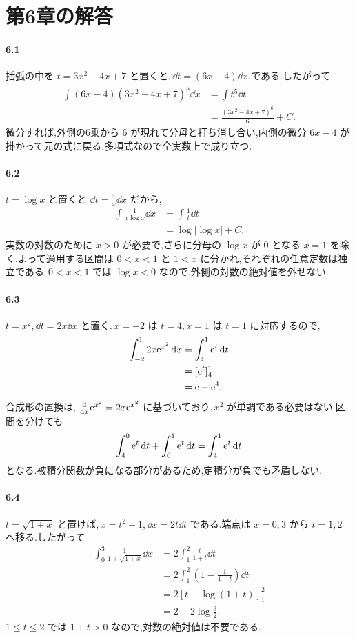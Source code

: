 \section{第6章の解答}\label{解答:第6章}

\paragraph{6.1}
括弧の中を $t=3x^2-4x+7$ と置くと,\,$\dd t=(6x-4)\dd x$ である.したがって
\begin{align*}
 \int(6x-4)(3x^2-4x+7)^5\dd x
 &=\int t^5\dd t\\
 &=\frac{(3x^2-4x+7)^6}{6}+C.
\end{align*}
微分すれば,外側の6乗から $6$ が現れて分母と打ち消し合い,内側の微分 $6x-4$ が掛かって元の式に戻る.多項式なので全実数上で成り立つ.

\paragraph{6.2}
$t=\log x$ と置くと $\dd t=\frac1x\dd x$ だから,
\begin{align*}
 \int\frac1{x\log x}\dd x
 &=\int\frac1t\dd t\\
 &=\log|\log x|+C.
\end{align*}
実数の対数のために $x>0$ が必要で,さらに分母の $\log x$ が $0$ となる $x=1$ を除く.よって適用する区間は $0<x<1$ と $1<x$ に分かれ,それぞれの任意定数は独立である.\,$0<x<1$ では $\log x<0$ なので,外側の対数の絶対値を外せない.

\paragraph{6.3}
$t=x^2$,\,$\dd t=2x\dd x$ と置く.\,$x=-2$ は $t=4$,\,$x=1$ は $t=1$ に対応するので,
\begin{align*}
 \int_{-2}^1 2x\mathrm{e}^{x^2}\,\mathrm{d} x
 &=\int_4^1\mathrm{e}^t\,\mathrm{d} t\\
 &=[\mathrm{e}^t]_4^1\\
 &=\mathrm{e}-\mathrm{e}^4.
\end{align*}
合成形の置換は,\,$\frac{\,\mathrm{d}}{\,\mathrm{d} x}\mathrm{e}^{x^2}=2x\mathrm{e}^{x^2}$ に基づいており,\,$x^2$ が単調である必要はない.区間を分けても
\[
 \int_4^0\mathrm{e}^t\,\mathrm{d} t+\int_0^1\mathrm{e}^t\,\mathrm{d} t
 =\int_4^1\mathrm{e}^t\,\mathrm{d} t
\]
となる.被積分関数が負になる部分があるため,定積分が負でも矛盾しない.

\paragraph{6.4}
$t=\sqrt{1+x}$ と置けば,\,$x=t^2-1$,\,$\dd x=2t\dd t$ である.端点は $x=0,3$ から $t=1,2$ へ移る.したがって
\[
\begin{aligned}
 \int_0^3\frac1{1+\sqrt{1+x}}\dd x
 &=2\int_1^2\frac{t}{1+t}\dd t\\
 &=2\int_1^2\left(1-\frac1{1+t}\right)\dd t\\
 &=2[t-\log(1+t)]_1^2\\
 &=2-2\log\frac32.
\end{aligned}
\]
$1\le t\le2$ では $1+t>0$ なので,対数の絶対値は不要である.

